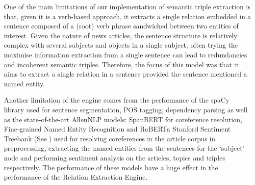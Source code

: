 One of the main limitations of our implementation of semantic triple extraction is that, given it is a verb-based approach, it extracts a single relation embedded in a sentence composed of a (root) verb phrase sandwiched between two entities of interest. 
Given the nature of news articles, the sentence structure is relatively complex with several subjects and objects in a single subject, often trying the maximise information extraction from a single sentence can lead to redundancies and incoherent semantic triples. Therefore, the focus of this model was that it aims to extract a single relation in a sentence provided the sentence mentioned a named entity. 

Another limitation of the engine comes from the performance of the spaCy library used for sentence segmentation, POS tagging, dependency parsing as well as the state-of-the-art AllenNLP models: SpanBERT for coreference resolution, Fine-grained Named Entity Recognition and RoBERTa Stanford Sentiment Treebank (See ) used for resolving coreferences in the article corpus in preprocessing, extracting the named entities from the sentences for the `subject' node and performing sentiment analysis on the articles, topics and triples respectively. The performance of these models have a huge effect in the performance of the Relation Extraction Engine. 

